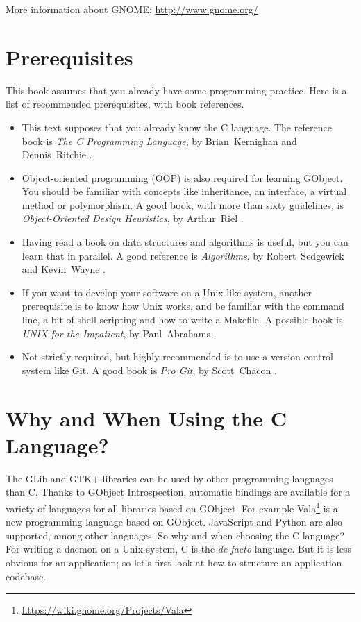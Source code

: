 More information about GNOME: \url{http://www.gnome.org/}

\section{Prerequisites}

This book assumes that you already have some programming practice. Here is a list of recommended prerequisites, with book references.

\begin{itemize}
  \item This text supposes that you already know the C language. The reference book is \emph{The C Programming Language}, by Brian~Kernighan and Dennis~Ritchie \cite{k-r-book}.

  \item Object-oriented programming (OOP) is also required for learning GObject. You should be familiar with concepts like inheritance, an interface, a virtual method or polymorphism. A good book, with more than sixty guidelines, is \emph{Object-Oriented Design Heuristics}, by Arthur~Riel \cite{oop-book}.

  \item Having read a book on data structures and algorithms is useful, but you can learn that in parallel. A good reference is \emph{Algorithms}, by Robert~Sedgewick and Kevin~Wayne \cite{algo-book}.

  \item If you want to develop your software on a Unix-like system, another prerequisite is to know how Unix works, and be familiar with the command line, a bit of shell scripting and how to write a Makefile. A possible book is \emph{UNIX for the Impatient}, by Paul~Abrahams \cite{unix-impatient}.

  \item Not strictly required, but highly recommended is to use a version control system like Git. A good book is \emph{Pro Git}, by Scott~Chacon \cite{pro-git}.
\end{itemize}

\section{Why and When Using the C Language?}

The GLib and GTK+ libraries can be used by other programming languages than C. Thanks to GObject Introspection, automatic bindings are available for a variety of languages for all libraries based on GObject. For example Vala\footnote{\url{https://wiki.gnome.org/Projects/Vala}} is a new programming language based on GObject. JavaScript and Python are also supported, among other languages. So why and when choosing the C language? For writing a daemon on a Unix system, C is the \emph{de facto} language. But it is less obvious for an application; so let's first look at how to structure an application codebase.

